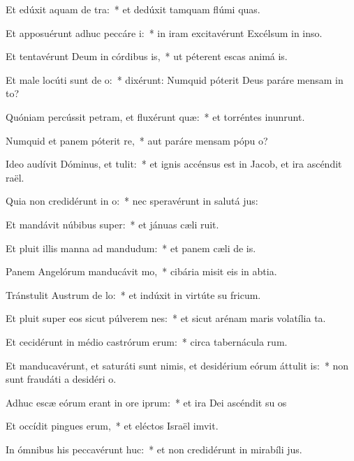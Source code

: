 \item Et edúxit aquam de tra:~* et dedúxit tamquam flúmi quas.
\item Et apposuérunt adhuc peccáre i:~* in iram excitavérunt Excélsum in inso.
\item Et tentavérunt Deum in córdibus is,~* ut péterent escas animá is.
\item Et male locúti sunt de o:~* dixérunt: Numquid póterit Deus paráre mensam in to?
\item Quóniam percússit petram, et fluxérunt quæ:~* et torréntes inunrunt.
\item Numquid et panem póterit re,~* aut paráre mensam pópu o?
\item Ideo audívit Dóminus, et tulit:~* et ignis accénsus est in Jacob, et ira ascéndit  raël.
\item Quia non credidérunt in o:~* nec speravérunt in salutá jus:
\item Et mandávit núbibus super:~* et jánuas cæli ruit.
\item Et pluit illis manna ad mandudum:~* et panem cæli de is.
\item Panem Angelórum manducávit mo,~* cibária misit eis in abtia.
\item Tránstulit Austrum de lo:~* et indúxit in virtúte su fricum.
\item Et pluit super eos sicut púlverem nes:~* et sicut arénam maris volatília ta.
\item Et cecidérunt in médio castrórum erum:~* circa tabernácula rum.
\item Et manducavérunt, et saturáti sunt nimis, et desidérium eórum áttulit is:~* non sunt fraudáti a desidéri o.
\item Adhuc escæ eórum erant in ore iprum:~* et ira Dei ascéndit su os
\item Et occídit pingues erum,~* et eléctos Israël imvit.
\item In ómnibus his peccavérunt huc:~* et non credidérunt in mirabíli jus.
